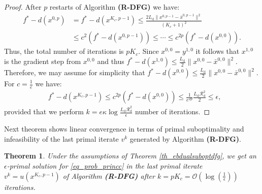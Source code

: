 \documentclass{gOMS2e}
\theoremstyle{plain}
\newtheorem{theorem}{Theorem}[section]
\theoremstyle{definition}
\theoremstyle{remark}
\begin{document}
\begin{proof}  After $p$ restarts of Algorithm {\bf (R-DFG)} we have:
\begin{align*}
f^* - d(x^{0,p})  & = f^* - d(x^{K_c,p-1})  \leq  \frac{2 L_\text{d} \|
x^{0,p-1} - \bar{x}^{0,p-1}\|^2}{(K_c+1)^2} \\
& \leq c^2 (f^* - d(x^{0,p-1})) \leq \cdots \leq c^{2p} (f^* - d(x^{0,0})).
\end{align*}
Thus, the total number of iterations is $p K_c$. Since $x^{0,0}=y^{1,0}$ it
follows that $x^{1,0}$ is the gradient step from $x^{0,0}$ and thus
$f^* - d(x^{1,0})  \leq \frac{L_\text{d}}{2} \|x^{0,0} -
\bar{x}^{0,0}\|^2$.  Therefore, we may assume for simplicity  that $f^* - d(x^{0,0})  \leq \frac{L_\text{d}}{2} \|x^{0,0} - \bar{x}^{0,0}\|^2$.  For $c = \frac{1}{e}$  we have:
\begin{align*}
& f^* - d(x^{K_c,p-1}) \leq c^{2p} (f^* - d(x^{0,0})) \leq  \frac{1}{e^{2p}} \frac{L_\text{d} \mathcal{R}_\text{d}^2}{2}  \leq    \epsilon,
\end{align*}
provided that we perform  $k= e  \kappa  \log
\frac{L_\text{d} \mathcal{R}_\text{d}^2}{\epsilon}$ number of iterations.
\end{proof}

\noindent Next theorem shows linear convergence in terms of primal suboptimality and infeasibility of the last primal iterate $v^k$ generated by Algorithm \textbf{(R-DFG)}.

\begin{theorem}
\label{th_urndfglast} Under the assumptions of Theorem \ref{th_ebdualsuboptdfg}, we get
an $\epsilon$-primal solution for \eqref{eq_prob_princc} in the last primal
iterate $v^{k} = u(x^{K_c,p-1})$ of Algorithm \textbf{(R-DFG)} after $k = p K_c =
\mathcal{O}(\log(\frac{1}{\epsilon}))$ iterations.
\end{theorem}
\end{document}
